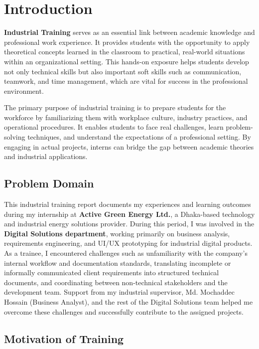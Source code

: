 \chapter{Introduction}

\par \textbf{Industrial Training} serves as an essential link between academic knowledge and professional work experience. It provides students with the opportunity to apply theoretical concepts learned in the classroom to practical, real-world situations within an organizational setting. This hands-on exposure helps students develop not only technical skills but also important soft skills such as communication, teamwork, and time management, which are vital for success in the professional environment.

\par The primary purpose of industrial training is to prepare students for the workforce by familiarizing them with workplace culture, industry practices, and operational procedures. It enables students to face real challenges, learn problem-solving techniques, and understand the expectations of a professional setting. By engaging in actual projects, interns can bridge the gap between academic theories and industrial applications.

\section{Problem Domain}

\par This industrial training report documents my experiences and learning outcomes during my internship at \textbf{Active Green Energy Ltd.}, a Dhaka-based technology and industrial energy solutions provider. During this period, I was involved in the \textbf{Digital Solutions department}, working primarily on business analysis, requirements engineering, and UI/UX prototyping for industrial digital products. As a trainee, I encountered challenges such as unfamiliarity with the company's internal workflow and documentation standards, translating incomplete or informally communicated client requirements into structured technical documents, and coordinating between non-technical stakeholders and the development team. Support from my industrial supervisor, Md. Mochaddec Hossain (Business Analyst), and the rest of the Digital Solutions team helped me overcome these challenges and successfully contribute to the assigned projects.

\section{Motivation of Training}

